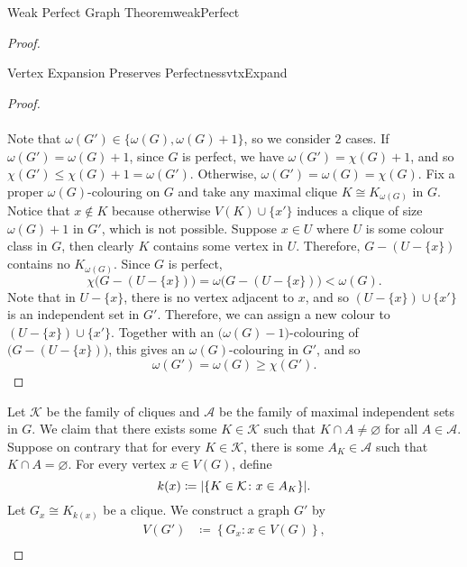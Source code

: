 \documentclass[math, code]{amznotes}
\theoremstyle{remark}
\begin{document}
\begin{thmbox}{Weak Perfect Graph Theorem}{weakPerfect}
\begin{proof}
\begin{lembox}{Vertex Expansion Preserves Perfectness}{vtxExpand}
\begin{proof}
                \\\\
                Note that $\omega(G') \in \{\omega(G), \omega(G) + 1\}$, so we consider $2$ cases. If $\omega(G') = \omega(G) + 1$, since $G$ is perfect, we have $\omega(G') = \chi(G) + 1$, and so $\chi(G') \leq \chi(G) + 1 = \omega(G')$. Otherwise, $\omega(G') = \omega(G) = \chi(G)$. Fix a proper $\omega(G)$-colouring on $G$ and take any maximal clique $K \cong K_{\omega(G)}$ in $G$. Notice that $x \notin K$ because otherwise $V(K) \cup \{x'\}$ induces a clique of size $\omega(G) + 1$ in $G'$, which is not possible. Suppose $x \in U$ where $U$ is some colour class in $G$, then clearly $K$ contains some vertex in $U$. Therefore, $G - (U - \{x\})$ contains no $K_{\omega(G)}$. Since $G$ is perfect,
                \begin{equation*}
                    \chi\bigl(G - (U - \{x\})\bigr) = \omega\bigl(G - (U - \{x\})\bigr) < \omega(G).
                \end{equation*}
                Note that in $U - \{x\}$, there is no vertex adjacent to $x$, and so $(U - \{x\}) \cup \{x'\}$ is an independent set in $G'$. Therefore, we can assign a new colour to $(U - \{x\}) \cup \{x'\}$. Together with an $\bigl(\omega(G) - 1\bigr)$-colouring of $\bigl(G - (U - \{x\})\bigr)$, this gives an $\omega(G)$-colouring in $G'$, and so 
                \begin{equation*}
                    \omega(G') = \omega(G) \geq \chi(G').
                \end{equation*}
            \end{proof}
        \end{lembox}
        Let $\mathcal{K}$ be the family of cliques and $\mathcal{A}$ be the family of maximal independent sets in $G$. We claim that there exists some $K \in \mathcal{K}$ such that $K \cap A \neq \varnothing$ for all $A \in \mathcal{A}$. Suppose on contrary that for every $K \in \mathcal{K}$, there is some $A_K \in \mathcal{A}$ such that $K \cap A = \varnothing$. For every vertex $x \in V(G)$, define 
        \begin{equation*}
            k(x) \coloneqq {\left\lvert {\left\{K \in \mathcal{K} \colon x \in A_K\right\}} \right\rvert}.
        \end{equation*}
        Let $G_x \cong K_{k(x)}$ be a clique. We construct a graph $G'$ by 
        \begin{align*}
            V(G') & \coloneqq \left\{G_x \colon x \in V(G)\right\}, \\

\end{align*}
\end{proof}
\end{thmbox}
\end{document}
